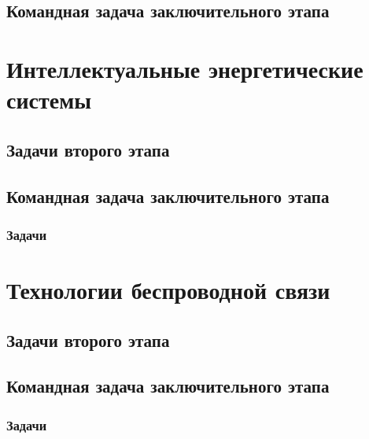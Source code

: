 \documentclass[a4paper,12pt,oneside]{book}
\begin{document}
\chapter{Командная задача заключительного этапа}


\part{Интеллектуальные энергетические системы}
\clearpage
\chapter{Задачи второго этапа}

\clearpage
\chapter{Командная задача заключительного этапа}
\section{Задачи}



\part{Технологии беспроводной связи}
\clearpage
\chapter{Задачи второго этапа}

\clearpage
\chapter{Командная задача заключительного этапа}
\section{Задачи}


\end{document}
